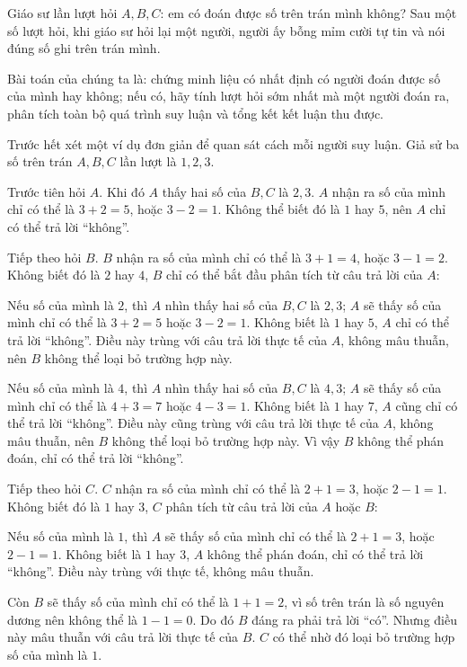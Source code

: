 \documentclass[11pt]{article}
\begin{document}
Giáo sư lần lượt hỏi \(A,B,C\): em có đoán được số trên trán mình không? Sau
một số lượt hỏi, khi giáo sư hỏi lại một người, người ấy bỗng mỉm cười tự tin
và nói đúng số ghi trên trán mình.

Bài toán của chúng ta là: chứng minh liệu có nhất định có người đoán được số
của mình hay không; nếu có, hãy tính lượt hỏi sớm nhất mà một người đoán ra,
phân tích toàn bộ quá trình suy luận và tổng kết kết luận thu được.

Trước hết xét một ví dụ đơn giản để quan sát cách mỗi người suy luận. Giả sử
ba số trên trán \(A,B,C\) lần lượt là \(1,2,3\).

Trước tiên hỏi \(A\). Khi đó \(A\) thấy hai số của \(B,C\) là \(2,3\). \(A\)
nhận ra số của mình chỉ có thể là \(3+2=5\), hoặc \(3-2=1\). Không thể biết
đó là \(1\) hay \(5\), nên \(A\) chỉ có thể trả lời ``không''.

Tiếp theo hỏi \(B\). \(B\) nhận ra số của mình chỉ có thể là \(3+1=4\), hoặc
\(3-1=2\). Không biết đó là \(2\) hay \(4\), \(B\) chỉ có thể bắt đầu phân
tích từ câu trả lời của \(A\):

Nếu số của mình là \(2\), thì \(A\) nhìn thấy hai số của \(B,C\) là \(2,3\);
\(A\) sẽ thấy số của mình chỉ có thể là \(3+2=5\) hoặc \(3-2=1\). Không biết
là \(1\) hay \(5\), \(A\) chỉ có thể trả lời ``không''. Điều này trùng với
câu trả lời thực tế của \(A\), không mâu thuẫn, nên \(B\) không thể loại bỏ
trường hợp này.

Nếu số của mình là \(4\), thì \(A\) nhìn thấy hai số của \(B,C\) là \(4,3\);
\(A\) sẽ thấy số của mình chỉ có thể là \(4+3=7\) hoặc \(4-3=1\). Không biết
là \(1\) hay \(7\), \(A\) cũng chỉ có thể trả lời ``không''. Điều này cũng
trùng với câu trả lời thực tế của \(A\), không mâu thuẫn, nên \(B\) không thể
loại bỏ trường hợp này. Vì vậy \(B\) không thể phán đoán, chỉ có thể trả lời
``không''.

Tiếp theo hỏi \(C\). \(C\) nhận ra số của mình chỉ có thể là \(2+1=3\), hoặc
\(2-1=1\). Không biết đó là \(1\) hay \(3\), \(C\) phân tích từ câu trả lời
của \(A\) hoặc \(B\):

Nếu số của mình là \(1\), thì \(A\) sẽ thấy số của mình chỉ có thể là
\(2+1=3\), hoặc \(2-1=1\). Không biết là \(1\) hay \(3\), \(A\) không thể
phán đoán, chỉ có thể trả lời ``không''. Điều này trùng với thực tế, không
mâu thuẫn.

Còn \(B\) sẽ thấy số của mình chỉ có thể là \(1+1=2\), vì số trên trán là số
nguyên dương nên không thể là \(1-1=0\). Do đó \(B\) đáng ra phải trả lời
``có''. Nhưng điều này mâu thuẫn với câu trả lời thực tế của \(B\). \(C\) có
thể nhờ đó loại bỏ trường hợp số của mình là \(1\).
\end{document}
